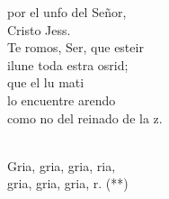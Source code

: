 \begin{cancion}
	por el unfo del Señor, \\
	Cristo Jess. \\
	Te romos, Ser, que esteir\\
	ilune toda estra osrid; \\
	que el lu mati\\
	lo encuentre arendo\\
	como no del reinado de la z.\\\jump\\
	\begin{chorus}%
	Gria, gria, gria, ria,\\
	gria, gria, gria, r. (**)\\
	\end{chorus}%
	\jump\\
\end{cancion}%

